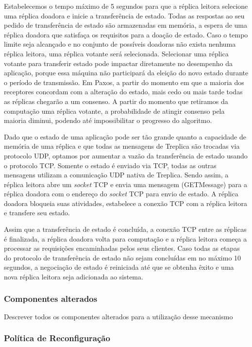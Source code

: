 Estabelecemos o tempo máximo de 5 segundos para que a réplica leitora selecione uma
réplica doadora e inicie a transferência de estado. Todas as respostas ao seu pedido de
transferência de estado são armazenadas em memória, a espera de uma réplica doadora que
satisfaça os requisitos para a doação de estado. Caso o tempo limite seja alcançado e no
conjunto de possíveis doadoras não exista nenhuma réplica leitora, uma réplica votante
será selecionada. Selecionar uma réplica votante para transferir estado pode impactar
diretamente no desempenho da aplicação, porque essa máquina não participará da eleição do
novo estado durante o período de transmissão. Em Paxos, a partir do momento em que a
maioria dos receptores concordam com a alteração do estado, mais cedo ou mais tarde todas
as réplicas chegarão a um consenso. A partir do momento que retiramos da computação uma
réplica votante, a probabilidade de atingir consenso pela maioria diminui, podendo até
impossibilitar o progresso do algoritmo.

Dado que o estado de uma aplicação pode ser tão grande quanto a capacidade de memória de
uma réplica e que todas as mensagens de Treplica são trocadas via protocolo UDP, optamos
por aumentar a vazão da transferência de estado usando o protocolo TCP. Somente o estado é
enviado via TCP, todas as outras mensagens utilizam a comunicação UDP nativa de Treplica.
Sendo assim, a réplica leitora abre um \emph{socket} TCP e envia uma mensagem
(GETMessage) para a réplica doadora com o endereço do \emph{socket} TCP para envio de
estado. A réplica doadora bloqueia suas atividades, estabelece a conexão TCP com a réplica
leitora e transfere seu estado.

Assim que a transferência de estado é concluída, a conexão TCP entre as réplicas é
finalizada, a réplica doadora volta para computação e a réplica leitora começa a processar
as requisições encaminhadas pelos seus clientes. Caso todas as etapas do protocolo de
transferência de estado não sejam concluídas em no máximo 10 segundos, a negociação de
estado  é reiniciada até que se obtenha êxito e uma nova  réplica leitora seja adicionada
ao sistema.

\subsubsection{Componentes alterados}

Descrever todos os componentes alterados para a utilização desse mecanismo

\subsubsection{Política de Reconfiguração}

